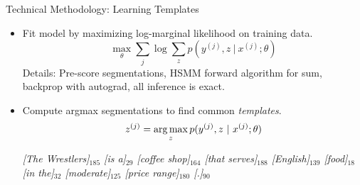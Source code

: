 \begin{frame}{Technical Methodology:  Learning Templates}

  \begin{itemize}
  \item Fit model by maximizing log-marginal likelihood on training data.
    \[ \max_\theta \sum_{j} \log \sum_z p(y^{(j)}, z \ |\ x^{(j)}; \theta)\]
    \air
  Details: Pre-score segmentations, HSMM forward algorithm for sum, backprop with autograd, all inference is exact.
    \air

    \pause

  \item Compute argmax segmentations to find common \textit{templates}.
    \[ z^{(j)} = \argmax_z p(y^{(j)}, z \ |\ x^{(j)}; \theta)\]


    {\it
    [The Wrestlers]$_{185}$ [is a]$_{29}$ [coffee shop]$_{164}$ [that serves]$_{188}$ [English]$_{139}$ [food]$_{18}$ [in the]$_{32}$ [moderate]$_{125}$ [price range]$_{180}$ [.]$_{90}$
  }
  \end{itemize}

\end{frame}


